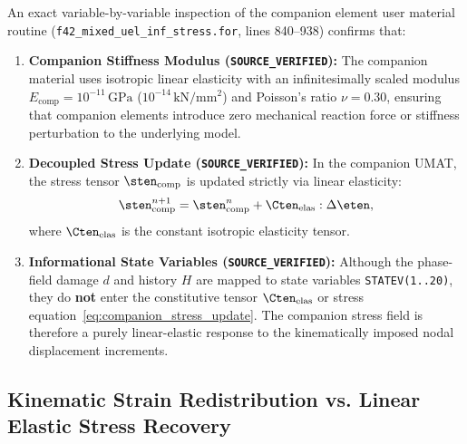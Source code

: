 An exact variable-by-variable inspection of the companion element user material routine (\texttt{f42\_mixed\_uel\_inf\_stress.for}, lines 840--938) confirms that:
\begin{enumerate}
    \item \textbf{Companion Stiffness Modulus (\texttt{SOURCE\_VERIFIED}):} The companion material uses isotropic linear elasticity with an infinitesimally scaled modulus $E_{\mathrm{comp}} = 10^{-11}\,\mathrm{GPa}$ ($10^{-14}\,\mathrm{kN/mm^2}$) and Poisson's ratio $\nu = 0.30$, ensuring that companion elements introduce zero mechanical reaction force or stiffness perturbation to the underlying model.
    \item \textbf{Decoupled Stress Update (\texttt{SOURCE\_VERIFIED}):} In the companion UMAT, the stress tensor $\sten_{\mathrm{comp}}$ is updated strictly via linear elasticity:
    \begin{equation}
    \label{eq:companion_stress_update}
    \sten_{\mathrm{comp}}^{n+1} = \sten_{\mathrm{comp}}^n + \Cten_{\mathrm{elas}} : \Delta\eten,
    \end{equation}
    where $\Cten_{\mathrm{elas}}$ is the constant isotropic elasticity tensor.
    \item \textbf{Informational State Variables (\texttt{SOURCE\_VERIFIED}):} Although the phase-field damage $d$ and history $H$ are mapped to state variables \texttt{STATEV(1..20)}, they do \textbf{not} enter the constitutive tensor $\Cten_{\mathrm{elas}}$ or stress equation~\eqref{eq:companion_stress_update}. The companion stress field is therefore a purely linear-elastic response to the kinematically imposed nodal displacement increments.
\end{enumerate}

\subsection{Kinematic Strain Redistribution vs. Linear Elastic Stress Recovery}
\label{subsec:stage14r_kinematics}

